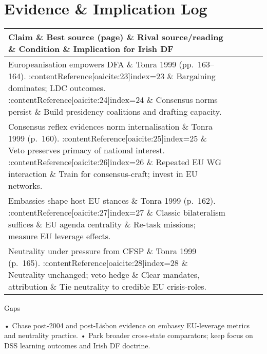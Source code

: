 \section*{Evidence \& Implication Log}
\begin{tabular}{p{3.2cm}p{4.2cm}p{3.6cm}p{3.2cm}p{4.2cm}}
		\textbf{Claim} \& \textbf{Best source (page)} \& \textbf{Rival source/reading} \& \textbf{Condition} \& \textbf{Implication for Irish DF}\\\hline
		Europeanisation empowers DFA \& Tonra 1999 (pp.~163–164). :contentReference[oaicite:23]{index=23} \& Bargaining dominates; LDC outcomes. :contentReference[oaicite:24]{index=24} \& Consensus norms persist \& Build presidency coalitions and drafting capacity.\\
		Consensus reflex evidences norm internalisation \& Tonra 1999 (p.~160). :contentReference[oaicite:25]{index=25} \& Veto preserves primacy of national interest. :contentReference[oaicite:26]{index=26} \& Repeated EU WG interaction \& Train for consensus-craft; invest in EU networks.\\
		Embassies shape host EU stances \& Tonra 1999 (p.~162). :contentReference[oaicite:27]{index=27} \& Classic bilateralism suffices \& EU agenda centrality \& Re-task missions; measure EU leverage effects.\\
		Neutrality under pressure from CFSP \& Tonra 1999 (p.~165). :contentReference[oaicite:28]{index=28} \& Neutrality unchanged; veto hedge \& Clear mandates, attribution \& Tie neutrality to credible EU crisis-roles.\\
\end{tabular}

Gaps

• Chase post-2004 and post-Lisbon evidence on embassy EU-leverage metrics and neutrality practice.
• Park broader cross-state comparators; keep focus on DSS learning outcomes and Irish DF doctrine.

\parencite{TONRA_2011
}

